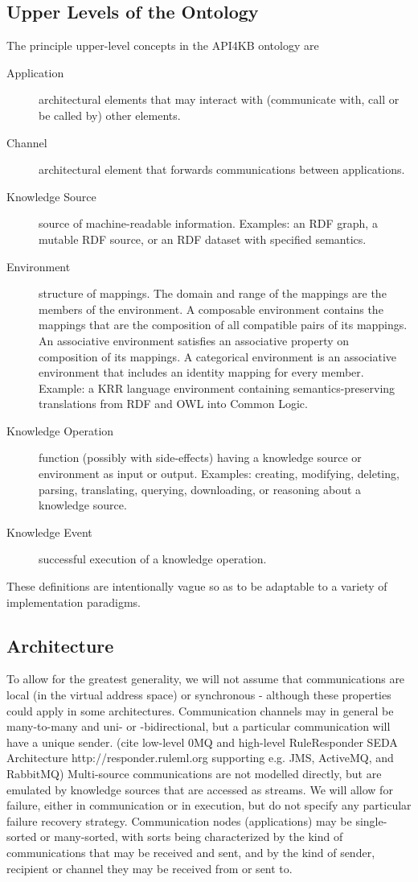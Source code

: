\documentclass[runningheads]{llncs}
\begin{document}
\subsection{Upper Levels of the Ontology}
\label{upper}
The principle upper-level concepts in the API4KB ontology are
\begin{description}
\item[Application] architectural elements that may interact with (communicate with, call or be called by) other elements.
\item[Channel] architectural element that forwards communications between applications.
\item[Knowledge Source] source of machine-readable information. Examples: an RDF graph, a mutable RDF source, or an RDF dataset with specified semantics.
\item[Environment] structure of mappings. The domain and range of the mappings are the members of the environment. A composable environment contains the mappings that are the composition of all compatible pairs of its mappings. An associative environment satisfies an associative property on composition of its mappings. A categorical environment is an associative environment that includes an identity mapping for every member. Example: a KRR language environment containing semantics-preserving translations from RDF and OWL into Common Logic.
\item[Knowledge Operation] function (possibly with side-effects) having a knowledge source or environment as input or output. Examples: creating, modifying, deleting, parsing, translating, querying, downloading, or reasoning about a knowledge source.
\item[Knowledge Event] successful execution of a knowledge operation.
\end{description}
These definitions are intentionally vague so as to be adaptable to a variety of implementation paradigms. 

\subsection{Architecture}
To allow for the greatest generality, we will not assume that communications are local (in the virtual address space) or synchronous - although these properties could apply in some architectures. Communication channels may in general be many-to-many and uni- or -bidirectional, but a particular communication will have a unique sender. (cite low-level 0MQ and high-level RuleResponder SEDA Architecture http://responder.ruleml.org supporting e.g. JMS, ActiveMQ, and RabbitMQ) Multi-source communications are not modelled directly, but are emulated by knowledge sources that are accessed as streams. We will allow for failure, either in communication or in execution, but do not specify any particular failure recovery strategy. Communication nodes (applications) may be single-sorted or many-sorted, with sorts being characterized by the kind of communications that may be received and sent, and by the kind of sender, recipient or channel they may be received from or sent to. 
\end{document}
